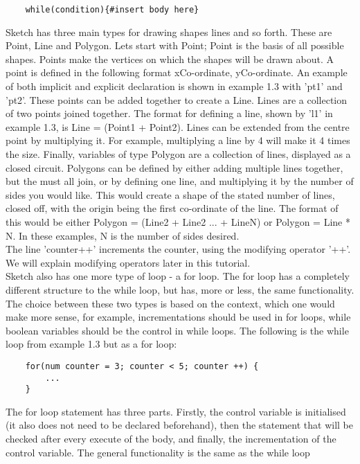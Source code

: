 \documentclass{l3proj}
\begin{document}
\begin{verbatim}
    while(condition){#insert body here} 
\end{verbatim}
Sketch has three main types for drawing shapes lines and so forth. These are Point, Line and Polygon. Lets start with Point; Point is the basis of all possible shapes. Points make the vertices on which the shapes will be drawn about. A point is defined in the following format {xCo-ordinate, yCo-ordinate}. An example of both implicit and explicit declaration is shown in example 1.3 with 'pt1' and 'pt2'. These points can be added together to create a Line. Lines are a collection of two points joined together. The format for defining a line, shown by 'l1' in example 1.3, is Line = (Point1 + Point2). Lines can be extended from the centre point by multiplying it. For example, multiplying a line by 4 will make it 4 times the size. Finally, variables of type Polygon are a collection of lines, displayed as a closed circuit. Polygons can be defined by either adding multiple lines together, but the must all join, or by defining one line, and multiplying it by the number of sides you would like. This would create a shape of the stated number of lines, closed off, with the origin being the first co-ordinate of the line. The format of this would be either Polygon = (Line2 + Line2 ... + LineN) or Polygon = Line * N. In these examples, N is the number of sides desired.
\\ [12pt]
The line 'counter++' increments the counter, using the modifying operator '++'. We will explain modifying operators later in this tutorial.
\\ [12pt]
Sketch also has one more type of loop - a for loop. The for loop has a completely different structure to the while loop, but has, more or less, the same functionality. The choice between these two types is based on the context, which one would make more sense, for example, incrementations should be used in for loops, while boolean variables should be the control in while loops. The following is the while loop from example 1.3 but as a for loop:

\begin{verbatim}
    for(num counter = 3; counter < 5; counter ++) {
        ...
    }
\end{verbatim}

The for loop statement has three parts. Firstly, the control variable is initialised (it also does not need to be declared beforehand), then the statement that will be checked after every execute of the body, and finally, the incrementation of the control variable. The general functionality is the same as the while loop
\end{document}
